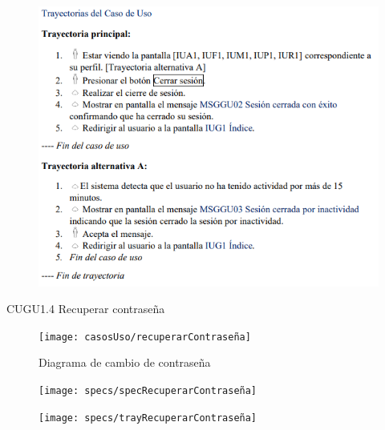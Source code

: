 \documentclass[12pt,letterpaper]{article}
\begin{document}
            \begin{figure}[H]
                \centering
                \includegraphics [scale=0.9]{specs/trayCerrarSesion}
            \end{figure}

            \newpage
            CUGU1.4 Recuperar contraseña 
            \begin{figure}[H]
                \centering
                \texttt{[image: casosUso/recuperarContraseña]}
                \caption{Diagrama de cambio de contraseña}
            \end{figure}
            \begin{figure}[H]
                \centering
                \texttt{[image: specs/specRecuperarContraseña]}
            \end{figure}
            \begin{figure}[H]
                \centering
                \texttt{[image: specs/trayRecuperarContraseña]}
            \end{figure}
\end{document}
